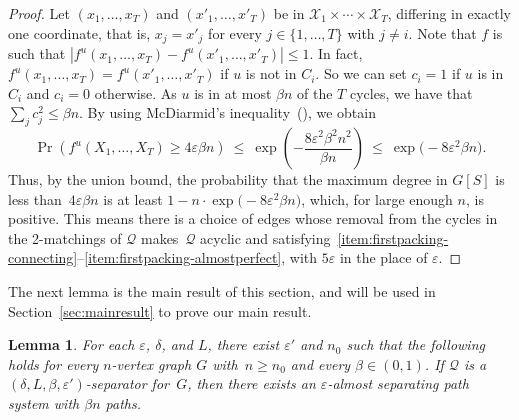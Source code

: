 \documentclass[a4paper, 11pt,reqno]{amsart}
\newcommand{\calQ}{\mathcal{Q}}
\newcommand{\calX}{\mathcal{X}}
\theoremstyle{plain}
\newtheorem{lemma}[theorem]{Lemma}
\theoremstyle{definition}
\numberwithin{equation}{section}
\newcommand{\eps}{\varepsilon}
\begin{document}
\begin{proof}
  Let $(x_1,\ldots,x_T)$ and $(x'_1,\ldots,x'_T)$ be in $\calX_1
  \times \dotsb \times \calX_T$, differing in exactly one coordinate,
  that is, $x_j = x'_j$ for every $j \in \{1,\ldots,T\}$ with $j \neq
  i$.  Note that $f$ is such that $|f^u(x_1,\ldots,x_T) -
  f^u(x'_1,\ldots,x'_T)| \leq 1$.  In fact, $f^u(x_1,\ldots,x_T) =
  f^u(x'_1,\ldots,x'_T)$ if $u$ is not in $C_i$.  So we can set $c_i =
  1$ if $u$ is in $C_i$ and $c_i = 0$ otherwise.  As $u$ is in at most
  $\beta n$ of the $T$ cycles, we have that $\sum_j c_j^2 \leq \beta
  n$.  By using McDiarmid's inequality~(), we
  obtain
  \[
    \Pr(f^u(X_1,\ldots,X_T) \geq 4\eps\beta n) \ \leq \
    \exp\left(-\frac{8\eps^2\beta^2n^2}{\beta n}\right) \ \leq \
    \exp\big(-8\eps^2\beta n\big).
  \]
  Thus, by the union bound, the probability that the maximum degree in
  $G[S]$ is less than~$4\eps\beta n$ is at least $1 - n\cdot
  \exp\big(-8\eps^2\beta n\big)$, which, for large enough $n$, is
  positive.  This means there is a choice of edges whose removal from
  the cycles in the 2-matchings of $\calQ$ makes~$\calQ$ acyclic and
  satisfying~\ref{item:firstpacking-connecting}--\ref{item:firstpacking-almostperfect},
  with $5\eps$ in the place of $\eps$.
\end{proof}

The next lemma is the main result of this section, 
and will be used in Section~\ref{sec:mainresult} to prove our main result. 

\begin{lemma} \label{lemma:connectingpaths} For each $\eps$, $\delta$,
  and $L$, there exist $\eps'$ and $n_0$ such that the following holds
  for every $n$-vertex graph $G$ with~$n \geq n_0$ and every $\beta
  \in (0,1)$.  If $\calQ$ is a $(\delta, L,\beta,\eps')$-separator
  for~$G$, then there exists an $\eps$-almost separating path system
  with $\beta n$ paths.
\end{lemma}
\end{document}
